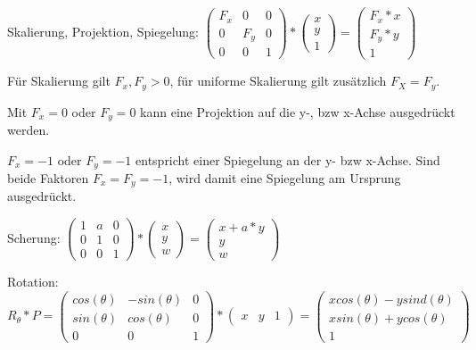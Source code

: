 \documentclass[10pt,landscape]{article}
\begin{document}
\begin{multicols}{3}
Skalierung, Projektion, Spiegelung: 
$\begin{pmatrix} F_x & 0 & 0 \\ 0 & F_y & 0 \\ 0 & 0 & 1 \end{pmatrix} * \begin{pmatrix} x \\ y \\ 1 \end{pmatrix} = \begin{pmatrix} F_x*x \\ F_y*y \\ 1 \end{pmatrix}$

Für Skalierung gilt $F_x,F_y>0$, für uniforme Skalierung gilt zusätzlich $F_X=F_y$. 

Mit $F_x=0$ oder $F_y=0$ kann eine Projektion auf die y-, bzw x-Achse ausgedrückt werden. 

$F_x=-1$ oder $F_y=-1$ entspricht einer Spiegelung an der y- bzw x-Achse. Sind beide Faktoren $F_x=F_y=-1$, wird damit eine Spiegelung am Ursprung ausgedrückt. 

Scherung:
$\begin{pmatrix} 1 & a & 0 \\ 0 & 1 & 0 \\ 0 & 0 & 1 \end{pmatrix} * \begin{pmatrix} x \\ y \\ w \end{pmatrix} = \begin{pmatrix} x+a*y \\ y \\ w \end{pmatrix}$

Rotation: 
$R_\theta *P= \begin{pmatrix}cos(\theta) & -sin(\theta) & 0 \\ sin(\theta) & cos(\theta) & 0 \\ 0 & 0 & 1 \end{pmatrix} * \begin{pmatrix}x & y & 1 \end{pmatrix} = \begin{pmatrix} x cos(\theta) - y sind(\theta)\\ x sin(\theta)+y cos(\theta)\\ 1 \end{pmatrix}$



\end{multicols}
\end{document}
